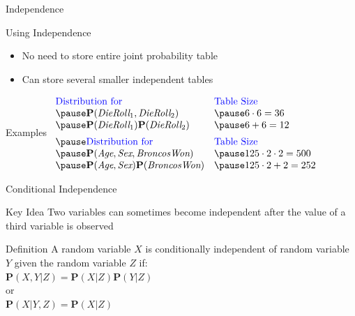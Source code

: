\documentclass[14pt]{beamer}
\begin{document}
\begin{frame}{Independence}
	\begin{block}{Using Independence}
		\begin{itemize}
			\item No need to store entire joint probability table
			\item Can store several smaller independent tables
		\end{itemize}
	\end{block}
	\pause
	\begin{block}{Examples}
		$
		\begin{array}{ll}
		\mbox{\keyword{Distribution for}}              & \mbox{\keyword{Table Size}} \\
		\pause\mathbf{P}(\textit{DieRoll}_{1},
		                 \textit{DieRoll}_{2})         & \pause 6 \cdot 6 = 36 \\
		\pause\mathbf{P}(\textit{DieRoll}_{1})
		      \mathbf{P}(\textit{DieRoll}_{2})         & \pause 6 + 6 = 12 \\[.5em]
		\pause
		\mbox{\keyword{Distribution for}}              & \mbox{\keyword{Table Size}} \\
		\pause\mathbf{P}(\textit{Age}, \textit{Sex},
		                 \textit{BroncosWon})          & \pause 125 \cdot 2 \cdot 2 = 500 \\
		\pause\mathbf{P}(\textit{Age}, \textit{Sex})
		      \mathbf{P}(\textit{BroncosWon})          & \pause 125 \cdot 2 + 2 = 252 \\
		\end{array}
		$
	\end{block}
\end{frame}
\begin{frame}{Conditional Independence}
	\begin{block}{Key Idea}
		Two variables can sometimes become independent after the value of a third variable is observed
	\end{block}
	\begin{block}{Definition}
		A random variable $X$ is \alert{conditionally independent} of random variable $Y$ given the random variable $Z$ if: \\
		\tab$\mathbf{P}(X,Y|Z) = \mathbf{P}(X|Z)\mathbf{P}(Y|Z)$ \\
		or \\
		\tab$\mathbf{P}(X|Y,Z) = \mathbf{P}(X|Z)$
	\end{block}
\end{frame}
\end{document}

